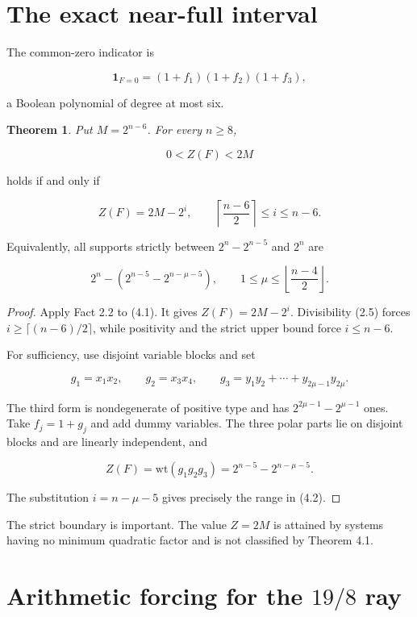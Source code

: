 \documentclass[11pt]{article}
\newtheorem{theorem}{Theorem}[section]
\theoremstyle{remark}
\numberwithin{equation}{section}
\begin{document}
\section{The exact near-full interval}


The common-zero indicator is

\[
\mathbf1_{F=0}=(1+f_1)(1+f_2)(1+f_3),           \tag{4.1}
\]

a Boolean polynomial of degree at most six.

\Needspace{0.23\textheight}
\begin{theorem}
Put \(M=2^{n-6}\). For every \(n\ge8\),
\end{theorem}


\[
0<Z(F)<2M
\]

holds if and only if

\[
Z(F)=2M-2^i,
\qquad
\left\lceil\frac{n-6}{2}\right\rceil\le i\le n-6.              \tag{4.2}
\]

Equivalently, all supports strictly between \(2^n-2^{n-5}\) and \(2^n\) are

\[
2^n-\left(2^{n-5}-2^{n-\mu-5}\right),
\qquad
1\le\mu\le\left\lfloor\frac{n-4}{2}\right\rfloor.             \tag{4.3}
\]

\begin{proof}
Apply Fact 2.2 to (4.1). It gives
\(Z(F)=2M-2^i\). Divisibility (2.5) forces
\(i\ge\lceil(n-6)/2\rceil\), while positivity and the strict upper bound force
\(i\le n-6\).

For sufficiency, use disjoint variable blocks and set

\[
g_1=x_1x_2,\qquad g_2=x_3x_4,
\qquad
g_3=y_1y_2+\cdots+y_{2\mu-1}y_{2\mu}.
\]

The third form is nondegenerate of positive type and has
\(2^{2\mu-1}-2^{\mu-1}\) ones. Take \(f_j=1+g_j\) and add dummy variables.
The three polar parts lie on disjoint blocks and are linearly independent, and

\[
Z(F)=\mathrm{wt}(g_1g_2g_3)
=2^{n-5}-2^{n-\mu-5}.
\]

The substitution \(i=n-\mu-5\) gives precisely the range in (4.2).
\end{proof}


The strict boundary is important. The value \(Z=2M\) is attained by systems
having no minimum quadratic factor and is not classified by Theorem 4.1.

\section{Arithmetic forcing for the \texorpdfstring{$19/8$}{19/8} ray}
\end{document}
